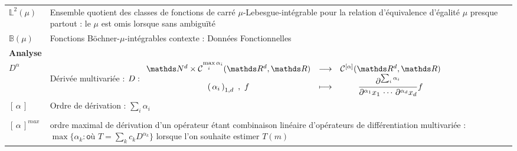 \begin{tabularx}{\linewidth}{lX}
	$\mathds L^2(\mu)$ & Ensemble quotient des classes de fonctions de carré $\mu$-Lebesgue-intégrable pour la relation d'équivalence d'égalité $\mu$ presque partout : le $\mu$ est omis lorsque sans ambiguïté\\
	$\mathds B(\mu)$ & Fonctions Böchner-$\mu$-intégrables \hspace{2cm} contexte : Données Fonctionnelles \\
	\midrule
	\textbf{Analyse}                                                                 &                                                                                                                                                                                                                                                     \\
	\midrule
	$D^\alpha$                                                                       & Dérivée multivariée : $D : \func{\grandN^d \times \mathcal C^{\max\limits_i \alpha_i}(\R d, \grandR)}{\mathcal C^{[\alpha]}(\R d, \grandR)}{\famfinie \alpha 1 d \ , \ f}{\displaystyle\frac{\partial^{\sum_i \alpha_i}}{\partial^{\alpha_1}x_1 \, \cdots \, \partial^{\alpha_d}x_d}f}$ \\
	$[ \, \alpha \, ]$                                                               & Ordre de dérivation : $\sum_i \alpha_i$                                                                                                                                                                                                             \\\\
	$[\, \alpha \,]^{max}$                                                           & ordre maximal de dérivation d'un opérateur étant combinaison linéaire d'opérateurs de différentiation multivariée : $\max\{ \alpha_k : \textsf{où } T = \sum_k c_k D^{\alpha_k} \}$ lorsque l'on souhaite estimer $T(m)$                            \\
	\bottomrule
\end{tabularx}

\pagebreak


